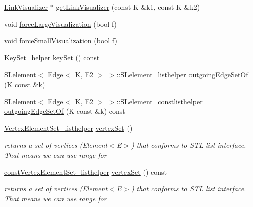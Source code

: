 \begin{DoxyCompactItemize}
\item 
\mbox{\hyperlink{classbridges_1_1datastructure_1_1_link_visualizer}{Link\+Visualizer}} $\ast$ \mbox{\hyperlink{classbridges_1_1datastructure_1_1_graph_adj_list_ae36ba10fae403339df0c36707ed13536}{get\+Link\+Visualizer}} (const K \&k1, const K \&k2)
\item 
void \mbox{\hyperlink{classbridges_1_1datastructure_1_1_graph_adj_list_a6860a0a153fd126ebe8b1bc40d2753a7}{force\+Large\+Visualization}} (bool f)
\item 
void \mbox{\hyperlink{classbridges_1_1datastructure_1_1_graph_adj_list_a9706e3df7d30320b7e7773a6423e4ff7}{force\+Small\+Visualization}} (bool f)
\item 
\mbox{\hyperlink{classbridges_1_1datastructure_1_1_graph_adj_list_1_1_key_set__helper}{Key\+Set\+\_\+helper}} \mbox{\hyperlink{classbridges_1_1datastructure_1_1_graph_adj_list_a0562e8d82499f26ad656a1dfb5f8908e}{key\+Set}} () const
\item 
\mbox{\hyperlink{classbridges_1_1datastructure_1_1_s_lelement}{S\+Lelement}}$<$ \mbox{\hyperlink{classbridges_1_1datastructure_1_1_edge}{Edge}}$<$ K, E2 $>$ $>$\+::S\+Lelement\+\_\+listhelper \mbox{\hyperlink{classbridges_1_1datastructure_1_1_graph_adj_list_ac066da800ab88dc2e55a89650e08bb78}{outgoing\+Edge\+Set\+Of}} (K const \&k)
\item 
\mbox{\hyperlink{classbridges_1_1datastructure_1_1_s_lelement}{S\+Lelement}}$<$ \mbox{\hyperlink{classbridges_1_1datastructure_1_1_edge}{Edge}}$<$ K, E2 $>$ $>$\+::S\+Lelement\+\_\+constlisthelper \mbox{\hyperlink{classbridges_1_1datastructure_1_1_graph_adj_list_ab0677da029442194925f8167cc2b8638}{outgoing\+Edge\+Set\+Of}} (K const \&k) const
\item 
\mbox{\hyperlink{classbridges_1_1datastructure_1_1_graph_adj_list_1_1_vertex_element_set__listhelper}{Vertex\+Element\+Set\+\_\+listhelper}} \mbox{\hyperlink{classbridges_1_1datastructure_1_1_graph_adj_list_a9dcf0bb4a68f3b02281c84e9bb69d6b3}{vertex\+Set}} ()
\begin{DoxyCompactList}\small\item\em returns a set of vertices (Element$<$\+E$>$) that conforms to S\+TL list interface. That means we can use range for \end{DoxyCompactList}\item 
\mbox{\hyperlink{classbridges_1_1datastructure_1_1_graph_adj_list_1_1const_vertex_element_set__listhelper}{const\+Vertex\+Element\+Set\+\_\+listhelper}} \mbox{\hyperlink{classbridges_1_1datastructure_1_1_graph_adj_list_a5ef96f5df21b2f9743b7bb79c10cf090}{vertex\+Set}} () const
\begin{DoxyCompactList}\small\item\em returns a set of vertices (Element$<$\+E$>$) that conforms to S\+TL list interface. That means we can use range for \end{DoxyCompactList}\end{DoxyCompactItemize}


